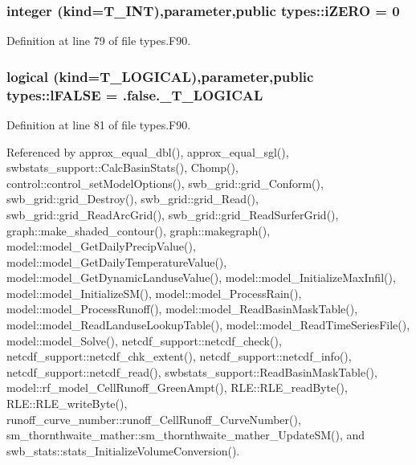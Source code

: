 \hypertarget{namespacetypes_a694f00629aa7084d30ef27a0f233de5a}{
\subsubsection[{iZERO}]{\setlength{\rightskip}{0pt plus 5cm}integer (kind={\bf T\_\-INT}),parameter,public {\bf types::iZERO} = 0}}
\label{namespacetypes_a694f00629aa7084d30ef27a0f233de5a}


Definition at line 79 of file types.F90.

\hypertarget{namespacetypes_ad09a27b431e0fad201524039e6943e5b}{
\subsubsection[{lFALSE}]{\setlength{\rightskip}{0pt plus 5cm}logical (kind={\bf T\_\-LOGICAL}),parameter,public {\bf types::lFALSE} = .false.\_\-T\_\-LOGICAL}}
\label{namespacetypes_ad09a27b431e0fad201524039e6943e5b}


Definition at line 81 of file types.F90.



Referenced by approx\_\-equal\_\-dbl(), approx\_\-equal\_\-sgl(), swbstats\_\-support::CalcBasinStats(), Chomp(), control::control\_\-setModelOptions(), swb\_\-grid::grid\_\-Conform(), swb\_\-grid::grid\_\-Destroy(), swb\_\-grid::grid\_\-Read(), swb\_\-grid::grid\_\-ReadArcGrid(), swb\_\-grid::grid\_\-ReadSurferGrid(), graph::make\_\-shaded\_\-contour(), graph::makegraph(), model::model\_\-GetDailyPrecipValue(), model::model\_\-GetDailyTemperatureValue(), model::model\_\-GetDynamicLanduseValue(), model::model\_\-InitializeMaxInfil(), model::model\_\-InitializeSM(), model::model\_\-ProcessRain(), model::model\_\-ProcessRunoff(), model::model\_\-ReadBasinMaskTable(), model::model\_\-ReadLanduseLookupTable(), model::model\_\-ReadTimeSeriesFile(), model::model\_\-Solve(), netcdf\_\-support::netcdf\_\-check(), netcdf\_\-support::netcdf\_\-chk\_\-extent(), netcdf\_\-support::netcdf\_\-info(), netcdf\_\-support::netcdf\_\-read(), swbstats\_\-support::ReadBasinMaskTable(), model::rf\_\-model\_\-CellRunoff\_\-GreenAmpt(), RLE::RLE\_\-readByte(), RLE::RLE\_\-writeByte(), runoff\_\-curve\_\-number::runoff\_\-CellRunoff\_\-CurveNumber(), sm\_\-thornthwaite\_\-mather::sm\_\-thornthwaite\_\-mather\_\-UpdateSM(), and swb\_\-stats::stats\_\-InitializeVolumeConversion().

